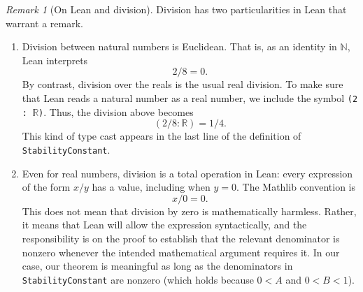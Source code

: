 \documentclass[11pt]{amsart}
\numberwithin{equation}{section}
\theoremstyle{definition}
\theoremstyle{remark}
\newtheorem{remark}[theorem]{Remark}
\begin{document}
\begin{remark}[On Lean and division]
Division has two particularities in Lean that warrant a remark.

\begin{enumerate}
    \item Division between natural numbers is Euclidean. That is, as an
    identity in $\mathbb N$, Lean interprets 
    \[
        2 / 8 = 0.
    \]
    By contrast, division over the reals is the usual real division. To make sure that
    Lean reads a natural number as a real number, we include the symbol
    {\scriptsize\texttt{(2 : $\mathbb R$)}}. Thus, the division above becomes
    \[
        (2 / 8 : \mathbb R) = 1/4.
    \]
    This kind of type cast appears in the last line of the
    definition of {\scriptsize\texttt{StabilityConstant}}.

    \item Even for real numbers, division is a total operation in Lean: every
    expression of the form $x/y$ has a value, including when $y=0$. The
    Mathlib convention is
    \[
        x / 0 = 0.
    \]
    This does not mean that division by zero is mathematically harmless.
    Rather, it means that Lean will allow the expression syntactically, and
    the responsibility is on the proof to establish that the relevant
    denominator is nonzero whenever the intended mathematical argument requires
    it. In our case, our theorem is meaningful as long as the denominators in {\scriptsize\texttt{StabilityConstant}} are nonzero (which holds because $0<A$ and $0< B < 1$).
\end{enumerate}
\end{remark}



\end{document}

